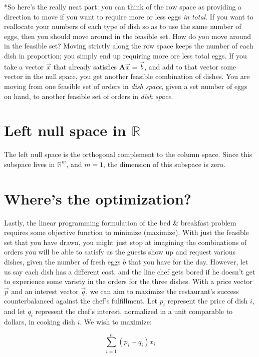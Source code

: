 \documentclass[11pt]{article}
\theoremstyle{plain} %
\theoremstyle{definition}
\theoremstyle{remark}
\begin{document}
\bigskip

*So here's the really neat part: you can think of the row space as providing a direction to move if you want to require more or less eggs \textit{in total}. If you want to reallocate your numbers of each type of dish so as to use the same number of eggs, then you should move around in the feasible set. How do you move around in the feasible set? Moving strictly along the row space keeps the number of each dish in proportion; you simply end up requiring more ore less total eggs. If you take a vector $\vec{x}$ that already satisfies $\mathbf{A}\vec{x}=\vec{b}$, and add to that vector some vector in the null space, you get another feasible combination of dishes. You are moving from one feasible set of orders in \textit{dish space}, given a set number of eggs on hand, to another feasible set of orders in \textit{dish space}.


\section{Left null space in $\mathbb{R}$}

The left null space is the orthogonal complement to the column space. Since this subspace lives in $\mathbb{R}^m$, and $m=1$, the dimension of this subspace is zero.


\section{Where's the optimization?}

Lastly, the linear programming formulation of the bed \& breakfast problem requires some objective function to minimize (maximize). With just the feasible set that you have drawn, you might just stop at imagining the combinations of orders you will be able to satisfy as the guests show up and request various dishes, given the number of fresh eggs $b$ that you have for the day. However, let us say each dish has a different cost, and the line chef gets bored if he doesn't get to experience some variety in the orders for the three dishes. With a price vector $\vec{p}$ and an interest vector $\vec{q}$, we can aim to maximize the restaurant's success counterbalanced against the chef's fulfillment. Let $p_i$ represent the price of dish $i$, and let $q_i$ represent the chef's interest, normalized in a unit comparable to dollars, in cooking dish $i$. We wish to maximize:

$$\sum_{i=1}^{n} (p_i + q_i)x_i$$ 
\end{document}
